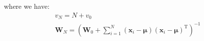 where we have:
\begin{gather}
v_{N}=N+v_{0}\\
\mathbf{W}_{N}=(\mathbf{W}_{0}+\sum_{i=1}^{N}(\mathbf{x}_{i}-\boldsymbol{\mu})(\mathbf{x}_{i}-\boldsymbol{\mu})^{\mathrm{T}})^{-1}
\end{gather}



